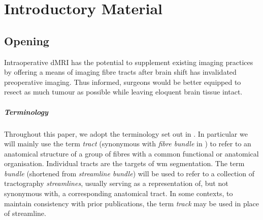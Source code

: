 \chapter{Introductory Material}
\label{chapterlabel0}

\section{Opening}


Intraoperative dMRI has the potential to supplement existing imaging practices by offering a means of imaging fibre tracts after brain shift has invalidated preoperative imaging.\autocite{Nimsky2001}
Thus informed, surgeons would be better equipped to resect as much tumour as possible while leaving eloquent brain tissue intact. 

\paragraph{Terminology}

Throughout this paper, we adopt the terminology set out in \textcite{Cote2013}.
In particular we will mainly use the term \textit{tract} (synonymous with \textit{fibre bundle} in \textcite{Cote2013}) to refer to an anatomical structure of a group of fibres with a common functional or anatomical organisation.
Individual tracts are the targets of \gls{wm} segmentation.
The term \textit{bundle} (shortened from \textit{streamline bundle}) will be used to refer to a collection of tractography \textit{streamlines}, usually serving as a representation of, but not synonymous with, a corresponding anatomical tract.
In some contexts, to maintain consistency with prior publications, the term \textit{track} may be used in place of streamline.
